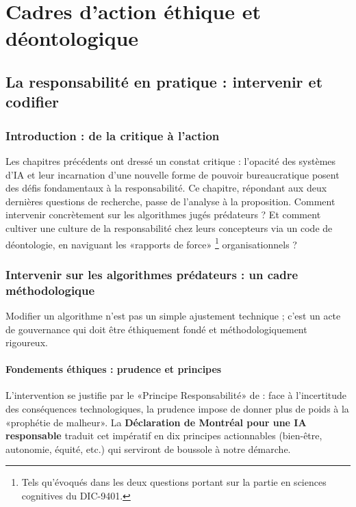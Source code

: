 \part{Cadres d'action éthique et déontologique}
\chapter{La responsabilité en pratique : intervenir et codifier}
\label{chap:deontologie}

\section{Introduction : de la critique à l'action}
Les chapitres précédents ont dressé un constat critique : l'opacité des systèmes d'IA et leur incarnation d'une nouvelle forme de pouvoir bureaucratique posent des défis fondamentaux à la responsabilité. Ce chapitre, répondant aux deux dernières questions de recherche, passe de l'analyse à la proposition. Comment intervenir concrètement sur les algorithmes jugés prédateurs ? Et comment cultiver une culture de la responsabilité chez leurs concepteurs via un code de déontologie, en naviguant les «rapports de force» \footnote{Tels qu'évoqués dans les deux questions portant sur la partie en sciences cognitives du DIC-9401.} organisationnels ?

\section{Intervenir sur les algorithmes prédateurs : un cadre méthodologique}
Modifier un algorithme n'est pas un simple ajustement technique ; c'est un acte de gouvernance qui doit être éthiquement fondé et méthodologiquement rigoureux.

\subsection{Fondements éthiques : prudence et principes}
L'intervention se justifie par le «Principe Responsabilité» de \citet{Jonas2021Das} : face à l'incertitude des conséquences technologiques, la prudence impose de donner plus de poids à la «prophétie de malheur». La \textbf{Déclaration de Montréal pour une IA responsable} \citep{Université2024Dclaration} traduit cet impératif en dix principes actionnables (bien-être, autonomie, équité, etc.) qui serviront de boussole à notre démarche.


